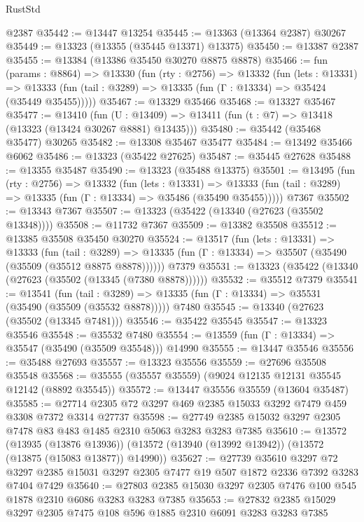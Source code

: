 \begin{lexlean}{RustStd}
\begin{coremodule}
    @2387
@35442 := @13447 @13254
@35445 := @13363 (@13364 @2387) @30267
@35449 := @13323 (@13355 (@35445 @13371) @13375)
@35450 := @13387 @2387
@35455 := @13384 (@13386 @35450 @30270 @8875 @8878)
@35466 := fun (params : @8864) =>
  @13330
    (fun (rty : @2756) =>
    @13332
      (fun (lets : @13331) =>
      @13333 (fun (tail : @3289) => @13335 (fun (Γ : @13334) => @35424 (@35449 @35455)))))
@35467 := @13329 @35466
@35468 := @13327 @35467
@35477 := @13410
    (fun (U : @13409) => @13411 (fun (t : @7) => @13418 (@13323 (@13424 @30267 @8881) @13435)))
@35480 := @35442 (@35468 @35477) @30265
@35482 := @13308 @35467 @35477
@35484 := @13492 @35466 @6062
@35486 := @13323 (@35422 @27625)
@35487 := @35445 @27628
@35488 := @13355 @35487
@35490 := @13323 (@35488 @13375)
@35501 := @13495
    (fun (rty : @2756) =>
    @13332
      (fun (lets : @13331) =>
      @13333 (fun (tail : @3289) => @13335 (fun (Γ : @13334) => @35486 (@35490 @35455)))))
    @7367
@35502 := @13343 @7367
@35507 := @13323 (@35422 (@13340 (@27623 (@35502 @13348))))
@35508 := @11732 @7367
@35509 := @13382 @35508
@35512 := @13385 @35508 @35450 @30270
@35524 := @13517
    (fun (lets : @13331) =>
    @13333
      (fun (tail : @3289) =>
      @13335 (fun (Γ : @13334) => @35507 (@35490 (@35509 (@35512 @8875 @8878))))))
    @7379
@35531 := @13323 (@35422 (@13340 (@27623 (@35502 (@13345 (@7380 @8878))))))
@35532 := @35512 @7379
@35541 := @13541
    (fun (tail : @3289) => @13335 (fun (Γ : @13334) => @35531 (@35490 (@35509 (@35532 @8878)))))
    @7480
@35545 := @13340 (@27623 (@35502 (@13345 @7481)))
@35546 := @35422 @35545
@35547 := @13323 @35546
@35548 := @35532 @7480
@35554 := @13559 (fun (Γ : @13334) => @35547 (@35490 (@35509 @35548))) @14990
@35555 := @13447 @35546
@35556 := @35488 @27693
@35557 := @13323 @35556
@35559 := @27696 @35508 @35548
@35568 := @35555 (@35557 @35559) (@9024 @12135 @12131 @35545 @12142 (@8892 @35545))
@35572 := @13447 @35556 @35559 (@13604 @35487)
@35585 := @27714 @2305 @72 @3297 @469 @2385 @15033 @3292 @7479 @459 @3308 @7372 @3314 @27737
@35598 := @27749 @2385 @15032 @3297 @2305 @7478 @83 @483 @1485 @2310 @5063 @3283 @3283 @7385
@35610 := @13572
    (@13935 (@13876 @13936))
    (@13572 (@13940 (@13992 @13942)) (@13572 (@13875 (@15083 @13877)) @14990))
@35627 := @27739
    @35610
    @3297
    @72
    @3297
    @2385
    @15031
    @3297
    @2305
    @7477
    @19
    @507
    @1872
    @2336
    @7392
    @3283
    @7404
    @7429
@35640 := @27803 @2385 @15030 @3297 @2305 @7476 @100 @545 @1878 @2310 @6086 @3283 @3283 @7385
@35653 := @27832 @2385 @15029 @3297 @2305 @7475 @108 @596 @1885 @2310 @6091 @3283 @3283 @7385

\end{coremodule}
\end{lexlean}
